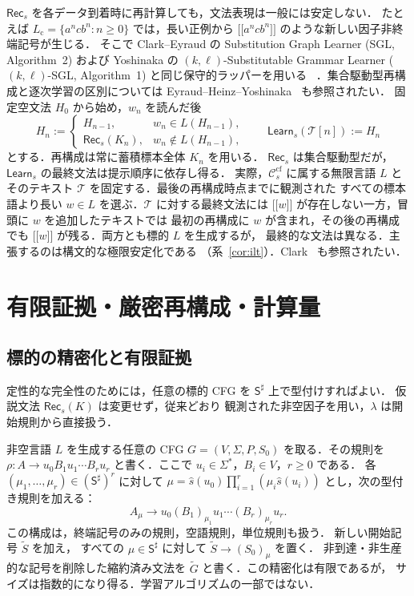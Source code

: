 \documentclass[11pt,a4paper]{ltjsarticle}
\newcommand{\NT}[1]{\mathopen{[\![}#1\mathclose{]\!]}}
\theoremstyle{remark}
\theoremstyle{plain}
\newcommand{\cf}{\mathrm{cf}}
\newcommand{\Ccf}[1]{\mathcal C_{#1}^{\cf}}
\begin{document}
$\mathsf{Rec}_s$ を各データ到着時に再計算しても，文法表現は一般には安定しない．
たとえば $L_{\mathrm c}=\{a^ncb^n:n\ge0\}$ では，長い正例から
$\NT{a^ncb^n}$ のような新しい因子非終端記号が生じる．
そこで Clark--Eyraud の Substitution Graph Learner (SGL, Algorithm~2)
および Yoshinaka の $(k,\ell)$-Substitutable Grammar Learner
($(k,\ell)$-SGL, Algorithm~1) と同じ保守的ラッパーを用いる
~\cite{clark-eyraud2007,yoshinaka2008}．集合駆動型再構成と逐次学習の区別については
Eyraud--Heinz--Yoshinaka~\cite[Appendix]{eyraud-heinz-yoshinaka2016} も参照されたい．
固定空文法 $H_0$ から始め，$w_n$ を読んだ後
\[
 H_n:=
 \begin{cases}
 H_{n-1},&w_n\in L(H_{n-1}),\\
 \mathsf{Rec}_s(K_n),&w_n\notin L(H_{n-1}),
 \end{cases}
 \qquad
 \mathsf{Learn}_s(\mathcal T[n]):=H_n
\]
とする．再構成は常に蓄積標本全体 $K_n$ を用いる．
$\mathsf{Rec}_s$ は集合駆動型だが，
$\mathsf{Learn}_s$ の最終文法は提示順序に依存し得る．
実際，$\Ccf{s}$ に属する無限言語 $L$ とそのテキスト
$\mathcal T$ を固定する．最後の再構成時点までに観測された
すべての標本語より長い $w\in L$ を選ぶ．$\mathcal T$ に対する最終文法には
$\NT{w}$ が存在しない一方，冒頭に $w$ を追加したテキストでは
最初の再構成に $w$ が含まれ，その後の再構成でも
$\NT{w}$ が残る．両方とも標的 $L$ を生成するが，
最終的な文法は異なる．主張するのは構文的な極限安定化である
（系~\ref{cor:ilt}）．Clark~\cite[Section~4, Example~1]{clark2013} も参照されたい．

\section{有限証拠・厳密再構成・計算量}
\label{sec:typing}

\subsection{標的の精密化と有限証拠}

定性的な完全性のためには，任意の標的 CFG を
$\mathsf S^\sharp$ 上で型付けすればよい．
仮説文法 $\mathsf{Rec}_s(K)$ は変更せず，従来どおり
観測された非空因子を用い，$\lambda$ は開始規則から直接扱う．

非空言語 $L$ を生成する任意の CFG
$G=(V,\Sigma,P,S_0)$ を取る．その規則を
$\rho:A\to u_0B_1u_1\cdots B_ru_r$
と書く．ここで $u_i\in\Sigma^*$，$B_i\in V$，$r\ge0$ である．
各 $(\mu_1,\ldots,\mu_r)\in(\mathsf S^\sharp)^r$ に対して
$\mu=\widehat s(u_0)\prod_{i=1}^r(\mu_i\widehat s(u_i))$
とし，次の型付き規則を加える：
\[
 A_\mu\to u_0(B_1)_{\mu_1}u_1\cdots(B_r)_{\mu_r}u_r.
\]
この構成は，終端記号のみの規則，空語規則，単位規則も扱う．
新しい開始記号 $\widetilde S$ を加え，
すべての $\mu\in\mathsf S^\sharp$ に対して
$\widetilde S\to(S_0)_\mu$ を置く．
非到達・非生産的な記号を削除した縮約済み文法を
$\widetilde G$ と書く．この精密化は有限であるが，
サイズは指数的になり得る．学習アルゴリズムの一部ではない．
\end{document}
